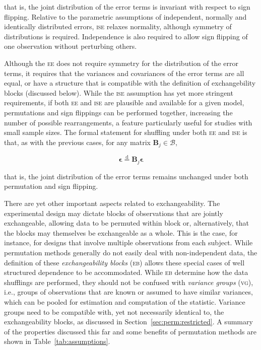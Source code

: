 \noindent
that is, the joint distribution of the error terms is invariant with respect to sign flipping. Relative to the parametric assumptions of independent, normally and identically distributed errors, \textsc{ise} relaxes normality, although symmetry of distributions is required. Independence is also required to allow sign flipping of one observation without perturbing others.

Although the \textsc{ee} does not require symmetry for the distribution of the error terms, it requires that the variances and covariances of the error terms are all equal, or have a structure that is compatible with the definition of exchangebility blocks (discussed below). While the \textsc{ise} assumption has yet more stringent requirements, if both \textsc{ee} and \textsc{ise} are plausible and available for a given model, permutations and sign flippings can be performed together, increasing the number of possible rearrangements, a feature particularly useful for studies with small sample sizes. The formal statement for shuffling under both \textsc{ee} and \textsc{ise} is that, as with the previous cases, for any matrix $\mathbf{B}_{j} \in \mathcal{B}$,

\begin{equation}
\boldsymbol{\epsilon} \stackrel{\mathrm{d}}{=} \mathbf{B}_{j}\boldsymbol{\epsilon}
\end{equation}

\noindent
that is, the joint distribution of the error terms remains unchanged under both permutation and sign flipping.

There are yet other important aspects related to exchangeability. The experimental design may dictate blocks of observations that are jointly exchangeable, allowing data to be permuted within block or, alternatively, that the blocks may themselves be exchangeable as a whole. This is the case, for instance, for designs that involve multiple observations from each subject. While permutation methods generally do not easily deal with non-independent data, the definition of these \emph{exchangeability blocks} (\textsc{eb}) allows these special cases of well structured dependence to be accommodated. While \textsc{eb} determine how the data shufflings are performed, they should not be confused with \emph{variance groups} (\textsc{vg}), i.e., groups of observations that are known or assumed to have similar variances, which can be pooled for estimation and computation of the statistic. Variance groups need to be compatible with, yet not necessarily identical to, the exchangeability blocks, as discussed in Section~\ref{sec:perm:restricted}. A summary of the properties discussed this far and some benefits of permutation methods are shown in Table~\ref{tab:assumptions}.

